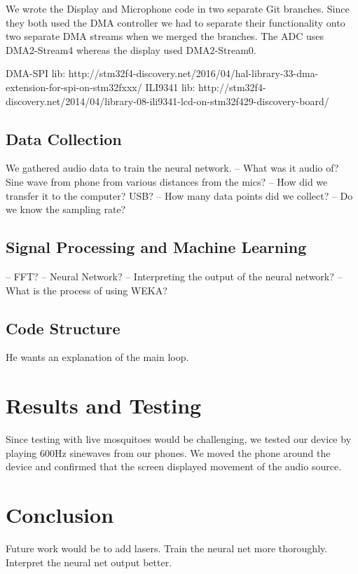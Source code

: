 \documentclass[twoside]{article}
\begin{document}
\begin{multicols}{2}
We wrote the Display and Microphone code in two separate Git branches. Since they both used the DMA controller we had to separate their functionality onto two separate DMA streams when we merged the branches. The ADC uses DMA2-Stream4 whereas the display used DMA2-Stream0.

DMA-SPI lib: http://stm32f4-discovery.net/2016/04/hal-library-33-dma-extension-for-spi-on-stm32fxxx/
ILI9341 lib: http://stm32f4-discovery.net/2014/04/library-08-ili9341-lcd-on-stm32f429-discovery-board/

\subsection{Data Collection}
We gathered audio data to train the neural network. 
-- What was it audio of? Sine wave from phone from various distances from the mics?
-- How did we transfer it to the computer? USB?
-- How many data points did we collect?
-- Do we know the sampling rate?

\subsection{Signal Processing and Machine Learning}
-- FFT?
-- Neural Network?
-- Interpreting the output of the neural network?
-- What is the process of using WEKA?

\subsection{Code Structure}
He wants an explanation of the main loop.


\section{Results and Testing}

Since testing with live mosquitoes would be challenging, we tested our device by playing 600Hz sinewaves from our phones. We moved the phone around the device and confirmed that the screen displayed movement of the audio source. 

\section{Conclusion}

Future work would be to add lasers. Train the neural net more thoroughly. Interpret the neural net output better. 


\end{multicols}
\end{document}
